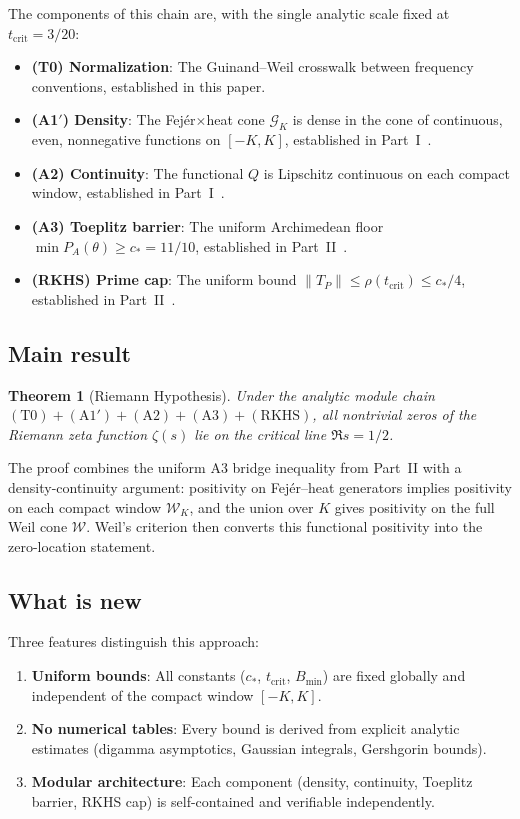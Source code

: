 \documentclass[11pt,a4paper]{article}
\newtheorem{theorem}{Theorem}[section]
\theoremstyle{definition}
\newcommand{\WW}{\mathcal{W}}
\newcommand{\GG}{\mathcal{G}}
\begin{document}
The components of this chain are, with the single analytic scale fixed at $t_{\mathrm{crit}}=3/20$:
\begin{itemize}
\item \textbf{(T0) Normalization}: The Guinand--Weil crosswalk between frequency conventions, established in this paper.
\item \textbf{(A1$'$) Density}: The Fej\'er$\times$heat cone $\GG_K$ is dense in the cone of continuous, even, nonnegative functions on $[-K,K]$, established in Part~I~\cite{Paper1}.
\item \textbf{(A2) Continuity}: The functional $Q$ is Lipschitz continuous on each compact window, established in Part~I~\cite{Paper1}.
\item \textbf{(A3) Toeplitz barrier}: The uniform Archimedean floor $\min P_A(\theta) \ge c_* = 11/10$, established in Part~II~\cite{Paper2}.
\item \textbf{(RKHS) Prime cap}: The uniform bound $\|T_P\| \le \rho(t_{\mathrm{crit}}) \le c_*/4$, established in Part~II~\cite{Paper2}.
\end{itemize}

\subsection*{Main result}

\begin{theorem}[Riemann Hypothesis]\label{thm:RH-intro}
Under the analytic module chain $\mathrm{(T0)} + \mathrm{(A1')} + \mathrm{(A2)} + \mathrm{(A3)} + \mathrm{(RKHS)}$, all nontrivial zeros of the Riemann zeta function $\zeta(s)$ lie on the critical line $\Re s = 1/2$.
\end{theorem}

The proof combines the uniform A3 bridge inequality from Part~II with a density-continuity argument: positivity on Fej\'er--heat generators implies positivity on each compact window $\WW_K$, and the union over $K$ gives positivity on the full Weil cone $\WW$. Weil's criterion then converts this functional positivity into the zero-location statement.

\subsection*{What is new}

Three features distinguish this approach:
\begin{enumerate}
\item \textbf{Uniform bounds}: All constants ($c_*$, $t_{\mathrm{crit}}$, $B_{\min}$) are fixed globally and independent of the compact window $[-K,K]$.
\item \textbf{No numerical tables}: Every bound is derived from explicit analytic estimates (digamma asymptotics, Gaussian integrals, Gershgorin bounds).
\item \textbf{Modular architecture}: Each component (density, continuity, Toeplitz barrier, RKHS cap) is self-contained and verifiable independently.
\end{enumerate}
\end{document}
